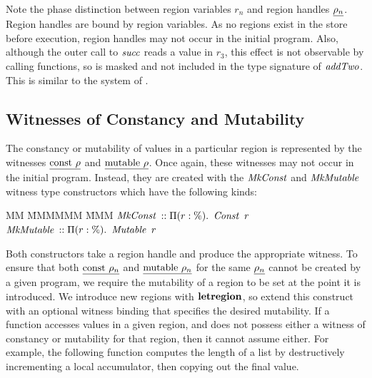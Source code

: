 Note the phase distinction between region variables $r_n$ and region handles $\underline{\rho_n}$. Region handles are bound by region variables. As no regions exist in the store before execution, region handles may not occur in the initial program. Also, although the outer call to $\operatorname{\mathit{succ}}$ reads a value in $r_3$, this effect is not observable by calling functions, so is masked and not included in the type signature of $\operatorname{\mathit{addTwo}}$. This is similar to the system of \cite{tofte:mlkit-4.3.0}.


\subsection{Witnesses of Constancy and Mutability}
\label{Witnesses:Constancy-and-Mutability}
The constancy or mutability of values in a particular region is represented by the witnesses $\underline{\textrm{const} \ \rho}$ and $\underline{\textrm{mutable} \ \rho}$. Once again, these witnesses may not occur in the initial program. Instead, they are created with the $\operatorname{\mathit{MkConst}}$ and $\operatorname{\mathit{MkMutable}}$ witness type constructors which have the following kinds:

\begin{tabbing}
MM \= MMMMMM \= MMM \kill
\> $\operatorname{\mathit{MkConst}}$   \> $:: \Pi (r : \%). \ \operatorname{\mathit{Const}} \ r$ \\
\> $\operatorname{\mathit{MkMutable}}$ \> $:: \Pi (r : \%). \ \operatorname{\mathit{Mutable}}\ r$ 
\end{tabbing}

Both constructors take a region handle and produce the appropriate witness. To ensure that both $\underline{\textrm{const} \ \rho_n}$ and $\underline{\textrm{mutable} \ \rho_n}$ for the same $\underline{\rho_n}$ cannot be created by a given program, we require the mutability of a region to be set at the point it is introduced. We introduce new regions with $\textrm{\textbf{letregion}}$, so extend this construct with an optional witness binding that specifies the desired mutability. If a function accesses values in a given region, and does not possess either a witness of constancy or mutability for that region, then it cannot assume either. For example, the following function computes the length of a list by destructively incrementing a local accumulator, then copying out the final value.

